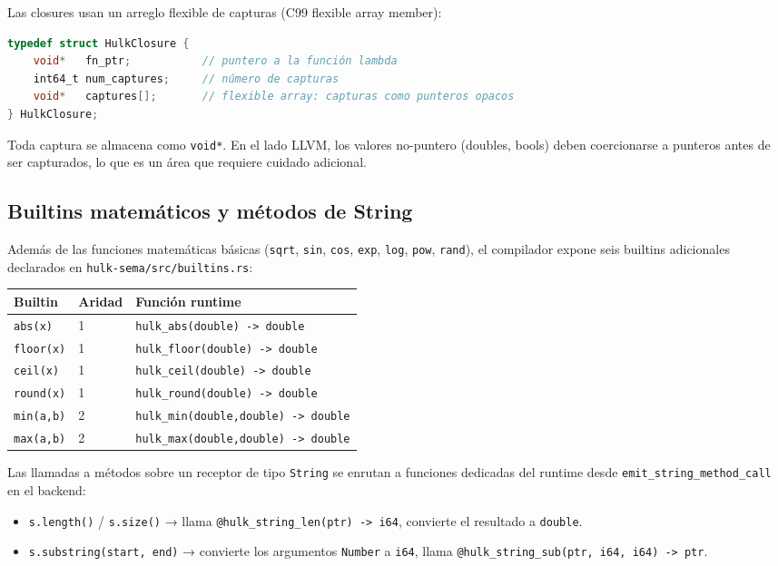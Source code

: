 \documentclass[12pt,letterpaper]{article}
\newcommand{\src}[1]{\texttt{#1}}
\begin{document}
Las closures usan un arreglo flexible de capturas (C99 flexible array member):

\begin{lstlisting}[language=C,caption={Estructura HulkClosure con capturas}]
typedef struct HulkClosure {
    void*   fn_ptr;           // puntero a la función lambda
    int64_t num_captures;     // número de capturas
    void*   captures[];       // flexible array: capturas como punteros opacos
} HulkClosure;
\end{lstlisting}

Toda captura se almacena como \src{void*}. En el lado LLVM, los valores no-puntero (doubles, bools) deben coercionarse a punteros antes de ser capturados, lo que es un área que requiere cuidado adicional.

\subsection{Builtins matemáticos y métodos de String}

Además de las funciones matemáticas básicas (\src{sqrt}, \src{sin}, \src{cos}, \src{exp}, \src{log}, \src{pow}, \src{rand}), el compilador expone seis builtins adicionales declarados en \src{hulk-sema/src/builtins.rs}:

\begin{longtable}{p{3cm}p{2.5cm}p{8cm}}
\toprule
\textbf{Builtin} & \textbf{Aridad} & \textbf{Función runtime} \\
\midrule
\src{abs(x)} & 1 & \src{hulk\_abs(double) -> double} \\
\src{floor(x)} & 1 & \src{hulk\_floor(double) -> double} \\
\src{ceil(x)} & 1 & \src{hulk\_ceil(double) -> double} \\
\src{round(x)} & 1 & \src{hulk\_round(double) -> double} \\
\src{min(a,b)} & 2 & \src{hulk\_min(double,double) -> double} \\
\src{max(a,b)} & 2 & \src{hulk\_max(double,double) -> double} \\
\bottomrule
\end{longtable}

Las llamadas a métodos sobre un receptor de tipo \src{String} se enrutan a funciones dedicadas del runtime desde \src{emit\_string\_method\_call} en el backend:

\begin{itemize}
    \item \src{s.length()} / \src{s.size()} → llama \src{@hulk\_string\_len(ptr) -> i64}, convierte el resultado a \src{double}.
    \item \src{s.substring(start, end)} → convierte los argumentos \src{Number} a \src{i64}, llama \src{@hulk\_string\_sub(ptr, i64, i64) -> ptr}.
\end{itemize}
\end{document}
